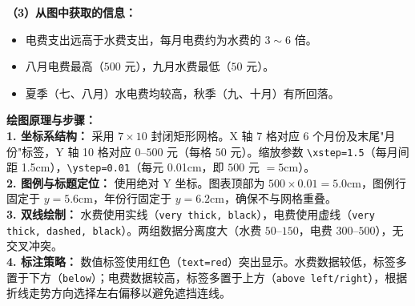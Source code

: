 \begin{center}
\end{center}

\vspace{0.3cm}
\textbf{（3）从图中获取的信息：}

\begin{itemize}
    \item 电费支出远高于水费支出，每月电费约为水费的 $3 \sim 6$ 倍。
    \item 八月电费最高（$500$ 元），九月水费最低（$50$ 元）。
    \item 夏季（七、八月）水电费均较高，秋季（九、十月）有所回落。
\end{itemize}

\vspace{0.4cm}
{\small\color{blue!70!black}
\textbf{绘图原理与步骤：}\\
\textbf{1. 坐标系结构：} 采用 $7 \times 10$ 封闭矩形网格。X 轴 7 格对应 6 个月份及末尾"月份"标签，Y 轴 10 格对应 $0$--$500$ 元（每格 $50$ 元）。缩放参数 \texttt{\textbackslash{}xstep=1.5}（每月间距 1.5cm），\texttt{\textbackslash{}ystep=0.01}（每元 0.01cm，即 $500$ 元 $= 5$cm）。\\
\textbf{2. 图例与标题定位：} 使用绝对 Y 坐标。图表顶部为 $500 \times 0.01 = 5.0$cm，图例行固定于 $y=5.6$cm，年份行固定于 $y=6.2$cm，确保不与网格重叠。\\
\textbf{3. 双线绘制：} 水费使用实线（\texttt{very thick, black}），电费使用虚线（\texttt{very thick, dashed, black}）。两组数据分离度大（水费 $50$--$150$，电费 $300$--$500$），无交叉冲突。\\
\textbf{4. 标注策略：} 数值标签使用红色（\texttt{text=red}）突出显示。水费数据较低，标签多置于下方（\texttt{below}）；电费数据较高，标签多置于上方（\texttt{above left/right}），根据折线走势方向选择左右偏移以避免遮挡连线。
}

\newpage



